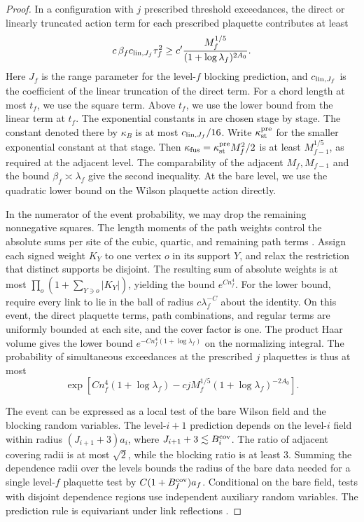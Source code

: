 \documentclass[11pt,a4paper]{article}
\numberwithin{equation}{section}
\begin{document}
\begin{proof}
In a configuration with \(j\) prescribed threshold exceedances, the direct or linearly truncated action term for each prescribed plaquette contributes at least
\[
 c\,\beta_f c_{{\rm lin},J_f}\tau_f^2
 \ge c'\frac{M_f^{1/5}}{(1+\log\lambda_f)^{2A_0}}.
\]
Here \(J_f\) is the range parameter for the level-\(f\) blocking prediction, and \(c_{{\rm lin},J_f}\) is the coefficient of the linear truncation of the direct term. For a chord length at most \(t_f\), we use the square term. Above \(t_f\), we use the lower bound from the linear term at \(t_f\). The exponential constants in \cite[Lemmas 11.12, 11.14, 13.5, 13.8, and 13.11--13.12]{armstrong} are chosen stage by stage. The constant denoted there by \(\kappa_B\) is at most \(c_{{\rm lin},J_f}/16\). Write \(\kappa_{\rm st}^{\rm pre}\) for the smaller exponential constant at that stage. Then \(\kappa_{\rm fus}=\kappa_{\rm st}^{\rm pre}M_f^2/2\) is at least \(M_{f-1}^{1/5}\), as required at the adjacent level. The comparability of the adjacent \(M_f,M_{f-1}\) and the bound \(\beta_f\asymp\lambda_f\) give the second inequality. At the bare level, we use the quadratic lower bound on the Wilson plaquette action directly.

In the numerator of the event probability, we may drop the remaining nonnegative squares. The length moments of the path weights control the absolute sums per site of the cubic, quartic, and remaining path terms \cite[Lemma 12.3]{armstrong}. Assign each signed weight \(K_Y\) to one vertex \(o\) in its support \(Y\), and relax the restriction that distinct supports be disjoint. The resulting sum of absolute weights is at most \(\prod_o(1+\sum_{Y\ni o}|K_Y|)\), yielding the bound \(e^{Cn_f^4}\). For the lower bound, require every link to lie in the ball of radius \(c\lambda_f^{-C}\) about the identity. On this event, the direct plaquette terms, path combinations, and regular terms are uniformly bounded at each site, and the cover factor is one. The product Haar volume gives the lower bound \(e^{-Cn_f^4(1+\log\lambda_f)}\) on the normalizing integral. The probability of simultaneous exceedances at the prescribed \(j\) plaquettes is thus at most
\[
 \exp\!\left[Cn_f^4(1+\log\lambda_f)
    -c j M_f^{1/5}(1+\log\lambda_f)^{-2A_0}\right].
\]

The event can be expressed as a local test of the bare Wilson field and the blocking random variables. The level-\(i+1\) prediction depends on the level-\(i\) field within radius \((J_{i+1}+3)a_i\), where \(J_{i+1}+3\lesssim B_i^{\rm cov}\). The ratio of adjacent covering radii is at most \(\sqrt2\), while the blocking ratio is at least \(3\). Summing the dependence radii over the levels bounds the radius of the bare data needed for a single level-\(f\) plaquette test by \(C(1+B_f^{\rm cov})a_f\). Conditional on the bare field, tests with disjoint dependence regions use independent auxiliary random variables. The prediction rule is equivariant under link reflections \cite[Definition 5.1 and Lemmas 11.4 and 14.29]{armstrong}.


\end{proof}
\end{document}
